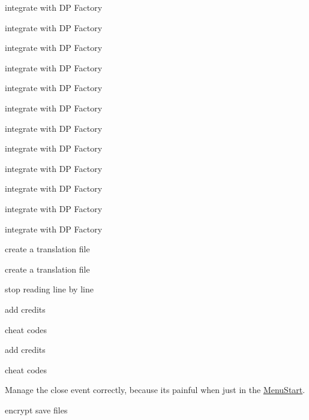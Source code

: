 
\begin{DoxyRefList}
\item[\label{todo__todo000001}%
\hypertarget{todo__todo000001}{}%
Class \hyperlink{class_b___movable}{B\+\_\+\+Movable} ]integrate with D\+P Factory 

integrate with D\+P Factory  
\item[\label{todo__todo000002}%
\hypertarget{todo__todo000002}{}%
Class \hyperlink{class_b___wall}{B\+\_\+\+Wall} ]integrate with D\+P Factory 

integrate with D\+P Factory  
\item[\label{todo__todo000003}%
\hypertarget{todo__todo000003}{}%
Class \hyperlink{class_b___water}{B\+\_\+\+Water} ]integrate with D\+P Factory 

integrate with D\+P Factory  
\item[\label{todo__todo000004}%
\hypertarget{todo__todo000004}{}%
Class \hyperlink{class_e___loup}{E\+\_\+\+Loup} ]integrate with D\+P Factory 

integrate with D\+P Factory  
\item[\label{todo__todo000005}%
\hypertarget{todo__todo000005}{}%
Class \hyperlink{class_e___renard}{E\+\_\+\+Renard} ]integrate with D\+P Factory 

integrate with D\+P Factory  
\item[\label{todo__todo000006}%
\hypertarget{todo__todo000006}{}%
Class \hyperlink{class_ennemi}{Ennemi} ]integrate with D\+P Factory 

integrate with D\+P Factory  
\item[\label{todo__todo000010}%
\hypertarget{todo__todo000010}{}%
Class \hyperlink{class_gameboard}{Gameboard} ]create a translation file 

create a translation file  
\item[\label{todo__todo000026}%
\hypertarget{todo__todo000026}{}%
Class \hyperlink{class_level}{Level} ]stop reading line by line  
\item[\label{todo__todo000008}%
\hypertarget{todo__todo000008}{}%
Class \hyperlink{class_m___pause}{M\+\_\+\+Pause} ]add credits 

cheat codes 

add credits 

cheat codes  
\item[\label{todo__todo000029}%
\hypertarget{todo__todo000029}{}%
Class \hyperlink{class_main_game}{Main\+Game} ]Manage the close event correctly, because it\textquotesingle{}s painful when just in the \hyperlink{class_menu_start}{Menu\+Start}.  
\item[\label{todo__todo000013}%
\hypertarget{todo__todo000013}{}%
Class \hyperlink{class_menu_start}{Menu\+Start} ]encrypt save files 


\end{DoxyRefList}
